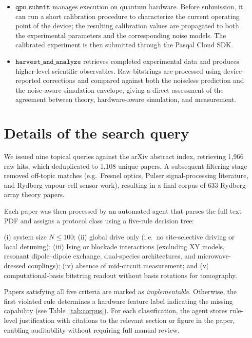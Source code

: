 \documentclass[aps,pra,reprint,amssymb,superscriptaddress,nofootinbib,floatfix]{revtex4-2}
\begin{document}
\begin{itemize}
    \item $\texttt{qpu_submit}$ manages execution on quantum hardware. Before submission, it can run a short calibration procedure to characterize the current operating point of the device; the resulting calibration values are propagated to both the experimental parameters and the corresponding noise models. The calibrated experiment is then submitted through the Pasqal Cloud SDK. \\ 
    \item $\texttt{harvest_and_analyze}$ retrieves completed experimental data and produces higher-level scientific observables. Raw bitstrings are processed using device-reported corrections and compared against both the noiseless prediction and the noise-aware simulation envelope, giving a direct assessment of the agreement between theory, hardware-aware simulation, and measurement.
\end{itemize}

\section{Details of the search query}\label{app:queries}

We issued nine topical queries against the arXiv abstract index, retrieving 1{,}966 raw hits, which deduplicated to 1{,}108 unique papers. A subsequent filtering stage removed off-topic matches (e.g.\ Fresnel optics, Pulser signal-processing literature, and Rydberg vapour-cell sensor work), resulting in a final corpus of 633 Rydberg-array theory papers.

Each paper was then processed by an automated agent that parses the full text PDF and assigns a protocol class using a five-rule decision tree:

(i) system size $N \le 100$;  
(ii) global drive only (i.e.\ no site-selective driving or local detuning);  
(iii) Ising or blockade interactions (excluding XY models, resonant dipole--dipole exchange, dual-species architectures, and microwave-dressed couplings);  
(iv) absence of mid-circuit measurement; and  
(v) computational-basis bitstring readout without basis rotations for tomography.

Papers satisfying all five criteria are marked as \emph{implementable}. Otherwise, the first violated rule determines a hardware feature label indicating the missing capability (see Table~\ref{tab:corpus}). For each classification, the agent stores rule-level justification with citations to the relevant section or figure in the paper, enabling auditability without requiring full manual review.
\end{document}
